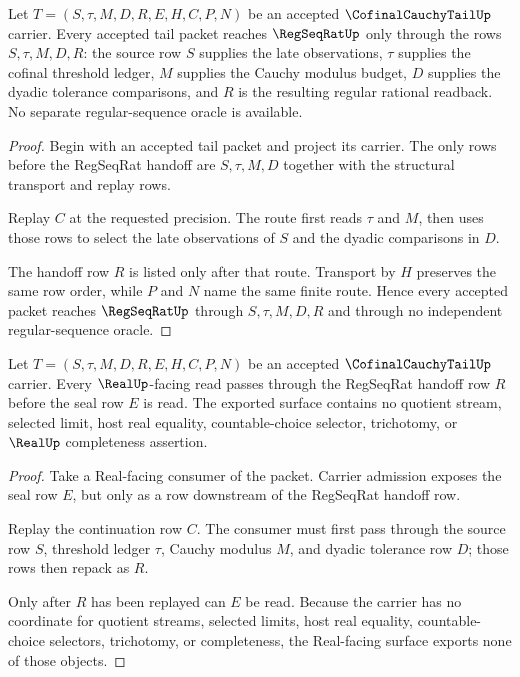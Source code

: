 \begin{theorem}
\label{thm:cofinal-cauchy-tail-regseqrat-handoff}
Let $T=(S,\tau,M,D,R,E,H,C,P,N)$ be an accepted $\CofinalCauchyTailUp$ carrier. Every accepted tail packet reaches $\RegSeqRatUp$ only through the rows $S,\tau,M,D,R$: the source row $S$ supplies the late observations, $\tau$ supplies the cofinal threshold ledger, $M$ supplies the Cauchy modulus budget, $D$ supplies the dyadic tolerance comparisons, and $R$ is the resulting regular rational readback. No separate regular-sequence oracle is available.
\end{theorem}
\begin{proof}
Begin with an accepted tail packet and project its carrier. The only rows before the RegSeqRat handoff are $S,\tau,M,D$ together with the structural transport and replay rows.

Replay $C$ at the requested precision. The route first reads $\tau$ and $M$, then uses those rows to select the late observations of $S$ and the dyadic comparisons in $D$.

The handoff row $R$ is listed only after that route. Transport by $H$ preserves the same row order, while $P$ and $N$ name the same finite route. Hence every accepted packet reaches $\RegSeqRatUp$ through $S,\tau,M,D,R$ and through no independent regular-sequence oracle.
\end{proof}

\begin{theorem}
\label{thm:cofinal-cauchy-tail-real-seal-boundary}
Let $T=(S,\tau,M,D,R,E,H,C,P,N)$ be an accepted $\CofinalCauchyTailUp$ carrier. Every $\RealUp$-facing read passes through the RegSeqRat handoff row $R$ before the seal row $E$ is read. The exported surface contains no quotient stream, selected limit, host real equality, countable-choice selector, trichotomy, or $\RealUp$ completeness assertion.
\end{theorem}
\begin{proof}
Take a Real-facing consumer of the packet. Carrier admission exposes the seal row $E$, but only as a row downstream of the RegSeqRat handoff row.

Replay the continuation row $C$. The consumer must first pass through the source row $S$, threshold ledger $\tau$, Cauchy modulus $M$, and dyadic tolerance row $D$; those rows then repack as $R$.

Only after $R$ has been replayed can $E$ be read. Because the carrier has no coordinate for quotient streams, selected limits, host real equality, countable-choice selectors, trichotomy, or completeness, the Real-facing surface exports none of those objects.
\end{proof}

